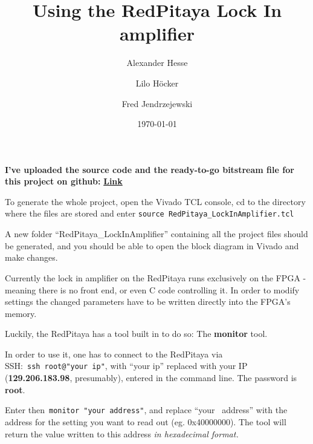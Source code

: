 \documentclass[10pt]{article}
\begin{document}
\title{Using the RedPitaya Lock In amplifier}



\author[1]{Alexander Hesse}%
\author[2]{Lilo Höcker}%
\author[1]{Fred Jendrzejewski}%
%
%


\vspace{-1em}



  \date{\today}


\begingroup
\let\center\flushleft
\let\endcenter\endflushleft
\maketitle
\endgroup








\sloppy


\textbf{I've uploaded the source code and the ready-to-go bitstream file
for this project on github:}
\href{https://github.com/ahesse93/RedPitaya_LockInAmplifier}{\textbf{Link}}

To generate the whole project, open the Vivado TCL console, cd to the
directory where the files are stored and enter
\texttt{source\ RedPitaya\_LockInAmplifier.tcl}

A new folder ``RedPitaya\_LockInAmplifier'' containing all the project
files should be generated, and you should be able to open the block
diagram in Vivado and make changes.

\par\null\par\null

Currently the lock in amplifier on the RedPitaya runs exclusively on the
FPGA - meaning there is no front end, or even C code controlling it. In
order to modify settings the changed parameters have to be written
directly into the FPGA's memory.

Luckily, the RedPitaya has a tool built in to do so: The
\textbf{monitor} tool.

\par\null

In order to use it, one has to connect to the RedPitaya via
SSH:~\texttt{ssh\ root@"your\ ip"}, with ``your ip'' replaced with your
IP (\textbf{129.206.183.98}, presumably), entered in the command line.
The password is \textbf{root}.

Enter then~\texttt{monitor\ "your\ address"}, and replace ``your~
address'' with the address for the setting you want to read out (eg.
0x40000000). The tool will return the value written to this address
\emph{in hexadecimal format.}
\end{document}
